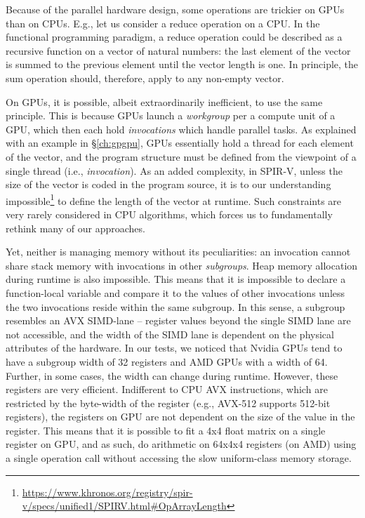 \documentclass{IEEEtran}
\begin{document}
Because of the parallel hardware design, some operations are trickier on GPUs than on CPUs. E.g., let us consider a reduce operation on a CPU. In the functional programming paradigm, a reduce operation could be described as a recursive function on a vector of natural numbers: the last element of the vector is summed to the previous element until the vector length is one. In principle, the sum operation should, therefore, apply to any non-empty vector.

On GPUs, it is possible, albeit extraordinarily inefficient, to use the same principle. This is because GPUs launch a \textit{workgroup} per a compute unit of a GPU, which then each hold \textit{invocations} which handle parallel tasks. As explained with an example in §\ref{ch:gpgpu}, GPUs essentially hold a thread for each element of the vector, and the program structure must be defined from the viewpoint of a single thread (i.e., \textit{invocation}). As an added complexity, in SPIR-V, unless the size of the vector is coded in the program source, it is to our understanding impossible\footnote{\url{https://www.khronos.org/registry/spir-v/specs/unified1/SPIRV.html#OpArrayLength}} to define the length of the vector at runtime. Such constraints are very rarely considered in CPU algorithms, which forces us to fundamentally rethink many of our approaches.

Yet, neither is managing memory without its peculiarities: an invocation cannot share stack memory with invocations in other \textit{subgroups}. Heap memory allocation during runtime is also impossible. This means that it is impossible to declare a function-local variable and compare it to the values of other invocations unless the two invocations reside within the same subgroup. In this sense, a subgroup resembles an AVX SIMD-lane -- register values beyond the single SIMD lane are not accessible, and the width of the SIMD lane is dependent on the physical attributes of the hardware. In our tests, we noticed that Nvidia GPUs tend to have a subgroup width of 32 registers and AMD GPUs with a width of 64. Further, in some cases, the width can change during runtime. However, these registers are very efficient. Indifferent to CPU AVX instructions, which are restricted by the byte-width of the register (e.g., AVX-512 supports 512-bit registers), the registers on GPU are not dependent on the size of the value in the register. This means that it is possible to fit a 4x4 float matrix on a single register on GPU, and as such, do arithmetic on 64x4x4 registers (on AMD) using a single operation call without accessing the slow uniform-class memory storage.
\end{document}
